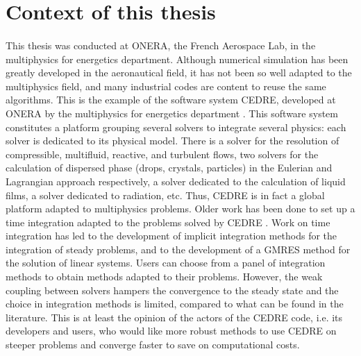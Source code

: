   \section*{Context of this thesis}

    \paragraph{}
    This thesis was conducted at ONERA, the French Aerospace Lab, in the multiphysics for energetics department.
    Although numerical simulation has been greatly developed in the aeronautical field, it has not been so well adapted to the multiphysics field, and many industrial codes are content to reuse the same algorithms.
    This is the example of the software system CEDRE, developed at ONERA by the multiphysics for energetics department \cite{ReflochCourbetMurroneEtAl2011}.
    This software system constitutes a platform grouping several solvers to integrate several physics: each solver is dedicated to its physical model.
    There is a solver for the resolution of compressible, multifluid, reactive, and turbulent flows, two solvers for the calculation of dispersed phase (drops, crystals, particles) in the Eulerian and Lagrangian approach respectively, a solver dedicated to the calculation of liquid films, a solver dedicated to radiation, etc.
    Thus, CEDRE is in fact a global platform adapted to multiphysics problems.
    Older work has been done to set up a time integration adapted to the problems solved by CEDRE \cite{Selva1998}.
    Work on time integration has led to the development of implicit integration methods for the integration of steady problems, and to the development of a GMRES method for the solution of linear systems.
    Users can choose from a panel of integration methods to obtain methods adapted to their problems.
    However, the weak coupling between solvers hampers the convergence to the steady state and the choice in integration methods is limited, compared to what can be found in the literature.
    This is at least the opinion of the actors of the CEDRE code, i.e. its developers and users, who would like more robust methods to use CEDRE on steeper problems and converge faster to save on computational costs.

